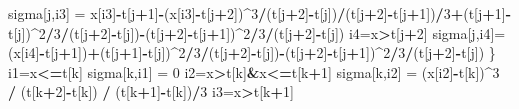 \documentclass[11pt,]{article}
\newenvironment{Shaded}{\begin{snugshade}}{\end{snugshade}}
\newcommand{\DecValTok}[1]{\textcolor[rgb]{0.00,0.00,0.81}{#1}}
\newcommand{\StringTok}[1]{\textcolor[rgb]{0.31,0.60,0.02}{#1}}
\newcommand{\OperatorTok}[1]{\textcolor[rgb]{0.81,0.36,0.00}{\textbf{#1}}}
\newcommand{\NormalTok}[1]{#1}
\begin{document}
\begin{Shaded}
\begin{Highlighting}[]
\NormalTok{    sigma[j,i3] =}\StringTok{ }\NormalTok{x[i3]}\OperatorTok{-}\NormalTok{t[j}\OperatorTok{+}\DecValTok{1}\NormalTok{]}\OperatorTok{-}\NormalTok{(x[i3]}\OperatorTok{-}\NormalTok{t[j}\OperatorTok{+}\DecValTok{2}\NormalTok{])}\OperatorTok{^}\DecValTok{3}\OperatorTok{/}\NormalTok{(t[j}\OperatorTok{+}\DecValTok{2}\NormalTok{]}\OperatorTok{-}\NormalTok{t[j])}\OperatorTok{/}\NormalTok{(t[j}\OperatorTok{+}\DecValTok{2}\NormalTok{]}\OperatorTok{-}\NormalTok{t[j}\OperatorTok{+}\DecValTok{1}\NormalTok{])}\OperatorTok{/}\DecValTok{3}\OperatorTok{+}\NormalTok{(t[j}\OperatorTok{+}\DecValTok{1}\NormalTok{]}\OperatorTok{-}\NormalTok{t[j])}\OperatorTok{^}\DecValTok{2}\OperatorTok{/}\DecValTok{3}\OperatorTok{/}\NormalTok{(t[j}\OperatorTok{+}\DecValTok{2}\NormalTok{]}\OperatorTok{-}\NormalTok{t[j])}\OperatorTok{-}\NormalTok{(t[j}\OperatorTok{+}\DecValTok{2}\NormalTok{]}\OperatorTok{-}\NormalTok{t[j}\OperatorTok{+}\DecValTok{1}\NormalTok{])}\OperatorTok{^}\DecValTok{2}\OperatorTok{/}\DecValTok{3}\OperatorTok{/}\NormalTok{(t[j}\OperatorTok{+}\DecValTok{2}\NormalTok{]}\OperatorTok{-}\NormalTok{t[j])}
\NormalTok{    i4=x}\OperatorTok{>}\NormalTok{t[j}\OperatorTok{+}\DecValTok{2}\NormalTok{]}
\NormalTok{    sigma[j,i4]=(x[i4]}\OperatorTok{-}\NormalTok{t[j}\OperatorTok{+}\DecValTok{1}\NormalTok{])}\OperatorTok{+}\NormalTok{(t[j}\OperatorTok{+}\DecValTok{1}\NormalTok{]}\OperatorTok{-}\NormalTok{t[j])}\OperatorTok{^}\DecValTok{2}\OperatorTok{/}\DecValTok{3}\OperatorTok{/}\NormalTok{(t[j}\OperatorTok{+}\DecValTok{2}\NormalTok{]}\OperatorTok{-}\NormalTok{t[j])}\OperatorTok{-}\NormalTok{(t[j}\OperatorTok{+}\DecValTok{2}\NormalTok{]}\OperatorTok{-}\NormalTok{t[j}\OperatorTok{+}\DecValTok{1}\NormalTok{])}\OperatorTok{^}\DecValTok{2}\OperatorTok{/}\DecValTok{3}\OperatorTok{/}\NormalTok{(t[j}\OperatorTok{+}\DecValTok{2}\NormalTok{]}\OperatorTok{-}\NormalTok{t[j])}
\NormalTok{  \}}
\NormalTok{  i1=x}\OperatorTok{<=}\NormalTok{t[k]}
\NormalTok{  sigma[k,i1] =}\StringTok{ }\DecValTok{0}
\NormalTok{  i2=x}\OperatorTok{>}\NormalTok{t[k]}\OperatorTok{&}\NormalTok{x}\OperatorTok{<=}\NormalTok{t[k}\OperatorTok{+}\DecValTok{1}\NormalTok{]}
\NormalTok{  sigma[k,i2] =}\StringTok{ }\NormalTok{(x[i2]}\OperatorTok{-}\NormalTok{t[k])}\OperatorTok{^}\DecValTok{3} \OperatorTok{/}\StringTok{ }\NormalTok{(t[k}\OperatorTok{+}\DecValTok{2}\NormalTok{]}\OperatorTok{-}\NormalTok{t[k]) }\OperatorTok{/}\StringTok{ }\NormalTok{(t[k}\OperatorTok{+}\DecValTok{1}\NormalTok{]}\OperatorTok{-}\NormalTok{t[k])}\OperatorTok{/}\DecValTok{3}
\NormalTok{  i3=x}\OperatorTok{>}\NormalTok{t[k}\OperatorTok{+}\DecValTok{1}\NormalTok{]}

\end{Highlighting}
\end{Shaded}
\end{document}
